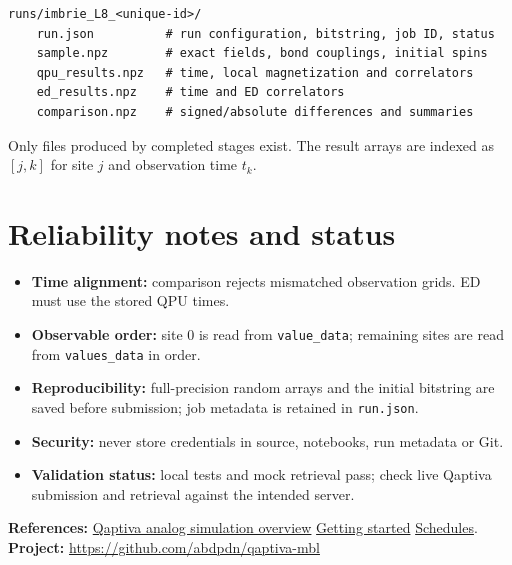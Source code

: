 \documentclass[10pt,a4paper]{article}
\begin{document}
\begin{lstlisting}[language={}]
runs/imbrie_L8_<unique-id>/
    run.json          # run configuration, bitstring, job ID, status
    sample.npz        # exact fields, bond couplings, initial spins
    qpu_results.npz   # time, local magnetization and correlators
    ed_results.npz    # time and ED correlators
    comparison.npz    # signed/absolute differences and summaries
\end{lstlisting}
Only files produced by completed stages exist. The result arrays are indexed as $[j,k]$ for site $j$ and observation time $t_k$.

\section{Reliability notes and status}
\begin{itemize}
\item \textbf{Time alignment:} comparison rejects mismatched observation grids. ED must use the stored QPU times.
\item \textbf{Observable order:} site 0 is read from \texttt{value\_data}; remaining sites are read from \texttt{values\_data} in order.
\item \textbf{Reproducibility:} full-precision random arrays and the initial bitstring are saved before submission; job metadata is retained in \texttt{run.json}.
\item \textbf{Security:} never store credentials in source, notebooks, run metadata or Git.
\item \textbf{Validation status:} local tests and mock retrieval pass; check live Qaptiva submission and retrieval against the intended server.
\end{itemize}

\noindent\textbf{References:} \href{https://qlm.bull.com/qlm/notebooks/tutorials/analog_simulations/overview.html}{Qaptiva analog simulation overview} \;\textbar\;
\href{https://qlm.bull.com/qlm/notebooks/tutorials/analog_simulations/aqpu_getting_started.html}{Getting started} \;\textbar\;
\href{https://qlm.bull.com/qlm/notebooks/tutorials/schedule_arithmetic.html}{Schedules}.\\
\textbf{Project:} \url{https://github.com/abdpdn/qaptiva-mbl}
\end{document}
